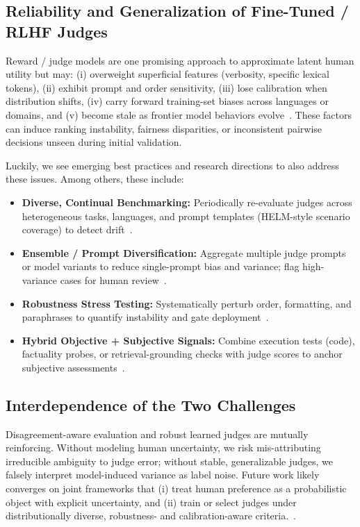 \subsection{Reliability and Generalization of Fine-Tuned / RLHF Judges}
Reward / judge models are one promising approach to approximate latent human utility but may: (i) overweight superficial features (verbosity, specific lexical tokens), (ii) exhibit prompt and order sensitivity, (iii) lose calibration when distribution shifts, (iv) carry forward training-set biases across languages or domains, and (v) become stale as frontier model behaviors evolve~\cite{li2024_llmsasjudges, bavaresco2024judgebench, hada2024metal}. These factors can induce ranking instability, fairness disparities, or inconsistent pairwise decisions unseen during initial validation.

Luckily, we see emerging best practices and research directions to also address these issues. Among others, these include:
\begin{itemize}
	\item \textbf{Diverse, Continual Benchmarking:} Periodically re-evaluate judges across heterogeneous tasks, languages, and prompt templates (HELM-style scenario coverage) to detect drift~\cite{liang2022helm, hada2024metal}.
	\item \textbf{Ensemble / Prompt Diversification:} Aggregate multiple judge prompts or model variants to reduce single-prompt bias and variance; flag high-variance cases for human review~\cite{li2024_llmsasjudges, zheng2023judgelm}.
	\item \textbf{Robustness Stress Testing:} Systematically perturb order, formatting, and paraphrases to quantify instability and gate deployment~\cite{zheng2023judgelm, li2024_llmsasjudges}.
	\item \textbf{Hybrid Objective + Subjective Signals:} Combine execution tests (code), factuality probes, or retrieval-grounding checks with judge scores to anchor subjective assessments~\cite{chen2021evaluating, liang2022helm}.
\end{itemize}

\subsection{Interdependence of the Two Challenges}
Disagreement-aware evaluation and robust learned judges are mutually reinforcing. Without modeling human uncertainty, we risk mis-attributing irreducible ambiguity to judge error; without stable, generalizable judges, we falsely interpret model-induced variance as label noise. Future work likely converges on joint frameworks that (i) treat human preference as a probabilistic object with explicit uncertainty, and (ii) train or select judges under distributionally diverse, robustness- and calibration-aware criteria.~\cite{li2024_llmsasjudges, liang2022helm, bavaresco2024judgebench}.